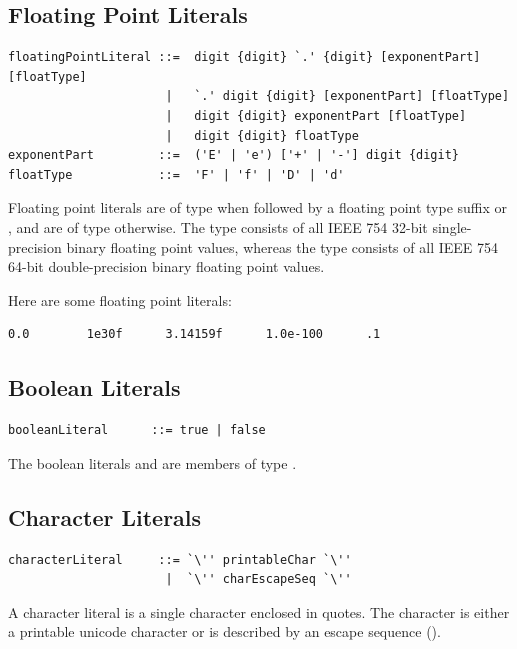 \subsection{Floating Point Literals}

\syntax\begin{lstlisting}
floatingPointLiteral ::=  digit {digit} `.' {digit} [exponentPart] [floatType]
                      |   `.' digit {digit} [exponentPart] [floatType]
                      |   digit {digit} exponentPart [floatType]
                      |   digit {digit} floatType
exponentPart         ::=  ('E' | 'e') ['+' | '-'] digit {digit}
floatType            ::=  'F' | 'f' | 'D' | 'd'
\end{lstlisting}
Floating point literals are of type \lstinline@float@ when followed by
a floating point type suffix \lstinline@F@ or \lstinline@f@, and are
of type \lstinline@double@ otherwise.  The type \lstinline@float@
consists of all IEEE 754 32-bit single-precision binary floating point
values, whereas the type \lstinline@double@ consists of all IEEE 754
64-bit double-precision binary floating point values.

\example
Here are some floating point literals:
\begin{lstlisting}
0.0        1e30f      3.14159f      1.0e-100      .1
\end{lstlisting}

\subsection{Boolean Literals}

\syntax\begin{lstlisting}
booleanLiteral      ::= true | false
\end{lstlisting}

The boolean literals \lstinline@true@ and \lstinline@false@ are
members of type \lstinline@boolean@.

\subsection{Character Literals}

\syntax\begin{lstlisting}
characterLiteral     ::= `\'' printableChar `\''
                      |  `\'' charEscapeSeq `\''
\end{lstlisting}

A character literal is a single character enclosed in quotes.
The character is either a printable unicode character or is described
by an escape sequence ().

